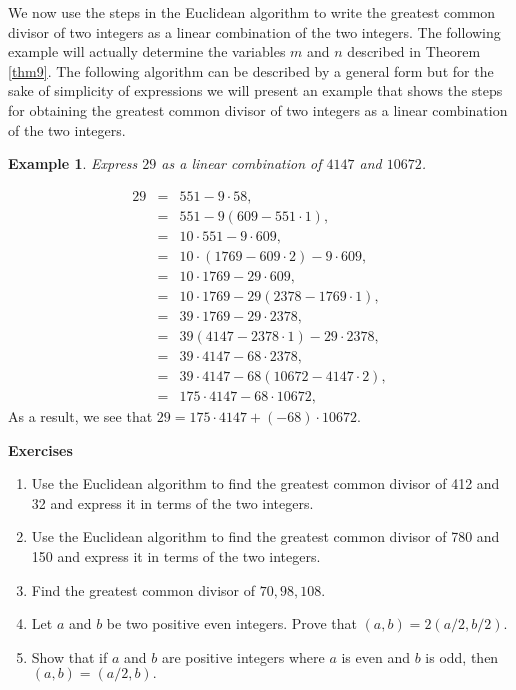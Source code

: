 \documentclass[12pt,letterpaper]{book}
\newtheorem{example}{Example}
\begin{document}
We now use the steps in the Euclidean algorithm to write the
greatest common divisor of two integers as a linear combination of
the two integers.  The following example will actually determine the
variables $m$ and $n$ described in Theorem \ref{thm9}.  The
following algorithm can be described by a general form but for the
sake of simplicity of expressions we will present an example that
shows the steps for obtaining the greatest common divisor of two
integers as a linear combination of the two integers.

\begin{example}
Express $29$ as a linear combination of $4147$ and $10672$.\\
\end{example}
\begin{eqnarray*}
29&=&551-9\cdot 58,\\
  &=& 551-9(609-551\cdot 1),\\
  &=& 10\cdot 551-9\cdot 609,\\
  &=& 10\cdot (1769-609\cdot 2)-9\cdot 609,\\
  &=& 10\cdot 1769-29\cdot 609,\\
  &=& 10\cdot 1769-29(2378-1769\cdot 1),\\
  &=& 39\cdot 1769-29\cdot 2378,\\
  &=& 39(4147-2378\cdot 1)-29\cdot 2378,\\
  &=& 39\cdot 4147-68\cdot 2378,\\
  &=& 39\cdot 4147-68(10672-4147\cdot 2),\\
  &=& 175\cdot 4147-68\cdot 10672,
\end{eqnarray*}
As a result, we see that $29=175\cdot 4147+(-68)\cdot 10672$.

\textbf{Exercises}
\begin{enumerate}
\item{Use the Euclidean algorithm to find the greatest common
divisor of 412 and 32 and express it in terms of the two
integers.}\item{Use the Euclidean algorithm to find the greatest
common divisor of 780 and 150 and express it in terms of the two
integers.}\item{Find the greatest common divisor of $70,98,
108$.}\item{Let $a$ and $b$ be two positive even integers.  Prove
that $(a,b)=2(a/2,b/2).$}\item{Show that if $a$ and $b$ are positive
integers where $a$ is even and $b$ is odd, then $(a,b)=(a/2,b).$}
\end{enumerate}
\end{document}
